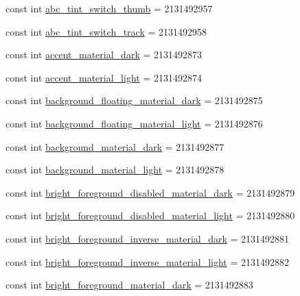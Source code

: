 \begin{CompactItemize}
\item 
const int \hyperlink{class__2doo_1_1_droid_1_1_resource_1_1_color_8a2f92e0fd030b8367c7b1f211cf0801}{abc\_\-tint\_\-switch\_\-thumb} = 2131492957
\item 
const int \hyperlink{class__2doo_1_1_droid_1_1_resource_1_1_color_48fdb762ba1c303fd0cb996b92149e7b}{abc\_\-tint\_\-switch\_\-track} = 2131492958
\item 
const int \hyperlink{class__2doo_1_1_droid_1_1_resource_1_1_color_e89b9c8481354f8d63aec781f1f25d43}{accent\_\-material\_\-dark} = 2131492873
\item 
const int \hyperlink{class__2doo_1_1_droid_1_1_resource_1_1_color_82a168215859db1d147a601053e4769d}{accent\_\-material\_\-light} = 2131492874
\item 
const int \hyperlink{class__2doo_1_1_droid_1_1_resource_1_1_color_d723a5760b532664364acb0cd1abb346}{background\_\-floating\_\-material\_\-dark} = 2131492875
\item 
const int \hyperlink{class__2doo_1_1_droid_1_1_resource_1_1_color_d5f5a42de3df390a80bb05570b2309c2}{background\_\-floating\_\-material\_\-light} = 2131492876
\item 
const int \hyperlink{class__2doo_1_1_droid_1_1_resource_1_1_color_edcda0b2c2bc4ba7de883a98db39a6be}{background\_\-material\_\-dark} = 2131492877
\item 
const int \hyperlink{class__2doo_1_1_droid_1_1_resource_1_1_color_4b24cce97d0918d2e95592fcfb68a11a}{background\_\-material\_\-light} = 2131492878
\item 
const int \hyperlink{class__2doo_1_1_droid_1_1_resource_1_1_color_9df2db8740e93f327b3880cbf829ce5a}{bright\_\-foreground\_\-disabled\_\-material\_\-dark} = 2131492879
\item 
const int \hyperlink{class__2doo_1_1_droid_1_1_resource_1_1_color_509898bbf67f6b5b6ea3515bdb9563b8}{bright\_\-foreground\_\-disabled\_\-material\_\-light} = 2131492880
\item 
const int \hyperlink{class__2doo_1_1_droid_1_1_resource_1_1_color_14da2540ff9f3101a22a1b7172ae267a}{bright\_\-foreground\_\-inverse\_\-material\_\-dark} = 2131492881
\item 
const int \hyperlink{class__2doo_1_1_droid_1_1_resource_1_1_color_0080a6cf737fd14b8d947275d1a61ced}{bright\_\-foreground\_\-inverse\_\-material\_\-light} = 2131492882
\item 
const int \hyperlink{class__2doo_1_1_droid_1_1_resource_1_1_color_812882b35772746d4a8195e54b599316}{bright\_\-foreground\_\-material\_\-dark} = 2131492883

\end{CompactItemize}
